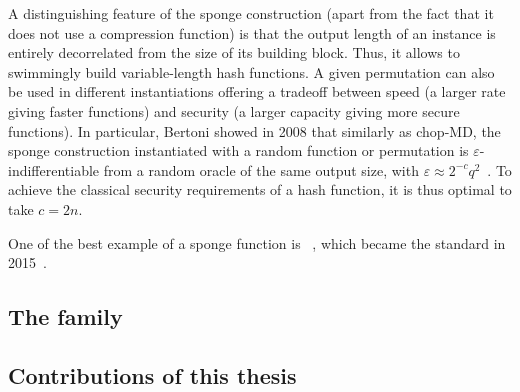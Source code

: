 A distinguishing feature of the sponge construction (apart from the fact that it does not use a compression function) is that the output length of an instance is entirely decorrelated from the size of its building
block. Thus, it allows to swimmingly build variable-length hash functions. A given permutation can also be used in different instantiations offering a tradeoff between speed (a larger rate giving
faster functions) and security (a larger capacity giving more secure functions).
In particular, Bertoni \etal showed in 2008 that similarly as chop-MD, the sponge construction instantiated with a random function or permutation is $\varepsilon$-indifferentiable from a random oracle
of the same output size, with $\varepsilon \approx 2^{-c}q^2$~\cite{DBLP:conf/eurocrypt/BertoniDPA08}. To achieve the classical security requirements of a hash function, it is thus optimal to take $c = 2n$.

One of the best example of a sponge function is \keccak~\cite{KeccakReference}, which became the \shathree standard in 2015~\cite{Nist-SHA3}. 

\subsection{The \mdsha family}
\label{sec:mdsha}


\subsection{Contributions of this thesis}


